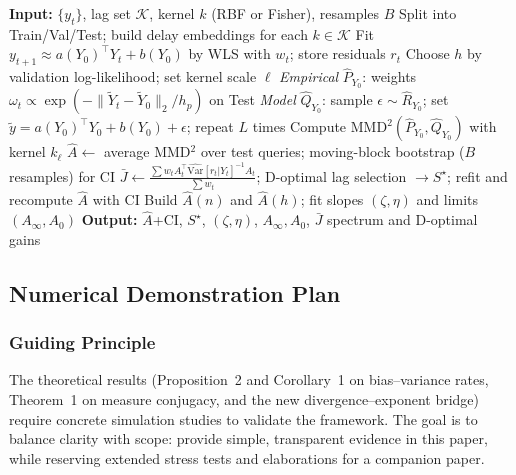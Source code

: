 \documentclass[11pt]{article}
\newcommand{\1}{\mathbf{1}}
\begin{document}
\begin{algorithm}[H]
\caption{LIA with exponential kernel and conditional MMD}
\begin{algorithmic}[1]
\State \textbf{Input:} $\{y_t\}$, lag set $\mathcal K$, kernel $k$ (RBF or Fisher), resamples $B$
\State Split into Train/Val/Test; build delay embeddings for each $k\in\mathcal K$
  \State Fit $y_{t+1}\approx a(Y_0)^\top Y_t+b(Y_0)$ by WLS with $w_t$; store residuals $r_t$
\EndFor
\State Choose $h$ by validation log-likelihood; set kernel scale $\ell$
  \State \emph{Empirical} $\widehat P_{Y_0}$: weights $\omega_t \propto \exp(-\|\widetilde Y_t-\widetilde Y_0\|_2/h_p)$ on Test
  \State \emph{Model} $\widehat Q_{Y_0}$: sample $\epsilon \sim \widehat R_{Y_0}$; set $\tilde y = a(Y_0)^\top Y_0 + b(Y_0)+\epsilon$; repeat $L$ times
  \State Compute $\mathrm{MMD}^2(\widehat P_{Y_0},\widehat Q_{Y_0})$ with kernel $k_\ell$
\EndFor
\State $\widehat A \gets$ average MMD$^2$ over test queries; moving-block bootstrap ($B$ resamples) for CI
\State $\bar J \gets \tfrac{\sum w_t A_t^\top \widehat{\mathrm{Var}}[r_t|Y_t]^{-1} A_t}{\sum w_t}$; D-optimal lag selection $\to S^\star$; refit and recompute $\widehat A$ with CI
\State Build $\widehat A(n)$ and $\widehat A(h)$; fit slopes $(\zeta,\eta)$ and limits $(A_\infty,A_0)$
\State \textbf{Output:} $\widehat A$+CI, $S^\star$, $(\zeta,\eta)$, $A_\infty,A_0$, $\bar J$ spectrum and D-optimal gains
\end{algorithmic}
\end{algorithm}

\subsection{Numerical Demonstration Plan}

\subsubsection{Guiding Principle}
The theoretical results (Proposition~2 and Corollary~1 on bias--variance rates, Theorem~1 on measure conjugacy, and the new divergence--exponent bridge) require concrete simulation studies to validate the framework. The goal is to balance clarity with scope: provide simple, transparent evidence in this paper, while reserving extended stress tests and elaborations for a companion paper.
\end{document}
